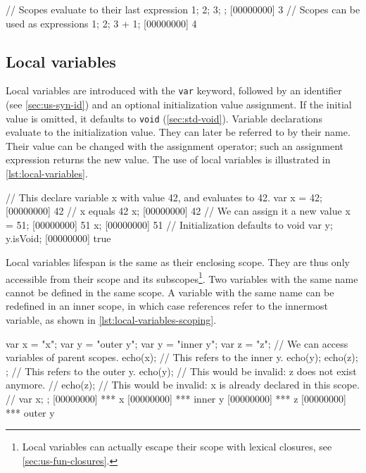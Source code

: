 \begin{urbiscript}[caption=Scopes,label=lst:scopes,float=\floatpos]
// Scopes evaluate to their last expression
{
  1;
  2;
  3;
};
[00000000] 3
// Scopes can be used as expressions
{1; 2; 3} + 1;
[00000000] 4
\end{urbiscript}

\subsection{Local variables}

Local variables are introduced with the \lstinline|var| keyword,
followed by an identifier (see \autoref{sec:us-syn-id}) and an optional
initialization value assignment. If the initial value is omitted, it
defaults to \lstinline"void" (\autoref{sec:std-void}). Variable
declarations evaluate to
the initialization value. They can later be referred to by their
name. Their value can be changed with the assignment operator; such an
assignment expression returns the new value. The use of local
variables is illustrated in \autoref{lst:local-variables}.

\begin{urbiscript}[caption=Using local variables,
  label=lst:local-variables,float=\floatpos]
// This declare variable x with value 42, and evaluates to 42.
var x = 42;
[00000000] 42
// x equals 42
x;
[00000000] 42
// We can assign it a new value
x = 51;
[00000000] 51
x;
[00000000] 51
// Initialization defaults to void
var y;
y.isVoid;
[00000000] true
\end{urbiscript}

Local variables lifespan is the same as their enclosing scope. They
are thus only accessible from their scope and its
subscopes\footnote{Local variables can actually escape their scope
  with lexical closures, see \autoref{sec:us-fun-closures}.}. Two
variables with the same name cannot be defined in the same scope. A
variable with the same name can be redefined in an inner scope, in which
case references refer to the innermost variable, as shown in
\autoref{lst:local-variables-scoping}.

\begin{urbiscript}[caption=Local variables scoping,
  label=lst:local-variables-scoping,float=\floatpos]
{
  var x = "x";
  var y = "outer y";
  {
    var y = "inner y";
    var z = "z";
    // We can access variables of parent scopes.
    echo(x);
    // This refers to the inner y.
    echo(y);
    echo(z);
  };
  // This refers to the outer y.
  echo(y);
  // This would be invalid: z does not exist anymore.
  // echo(z);
  // This would be invalid: x is already declared in this scope.
  // var x;
};
[00000000] *** x
[00000000] *** inner y
[00000000] *** z
[00000000] *** outer y
\end{urbiscript}

